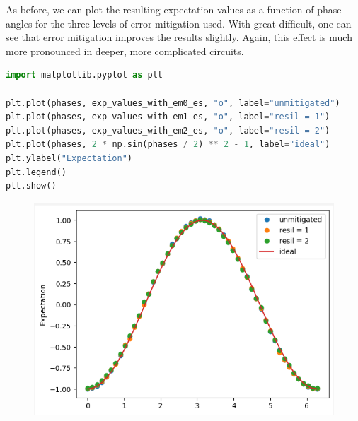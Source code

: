 \documentclass[12pt, oneside]{book}
\theoremstyle{definition}
\theoremstyle{definition}
\theoremstyle{remark}
\begin{document}
As before, we can plot the resulting expectation values as a function of phase angles for the three levels of error mitigation used. With great difficult, one can see that error mitigation improves the results slightly. Again, this effect is much more pronounced in deeper, more complicated circuits.

\begin{lstlisting}[language=Python]
import matplotlib.pyplot as plt

plt.plot(phases, exp_values_with_em0_es, "o", label="unmitigated")
plt.plot(phases, exp_values_with_em1_es, "o", label="resil = 1")
plt.plot(phases, exp_values_with_em2_es, "o", label="resil = 2")
plt.plot(phases, 2 * np.sin(phases / 2) ** 2 - 1, label="ideal")
plt.ylabel("Expectation")
plt.legend()
plt.show()
\end{lstlisting}
\begin{figure}[H]
    \centering
    \includegraphics[width=0.75\linewidth]{../images/zne-plot.png}
\end{figure}
\end{document}
